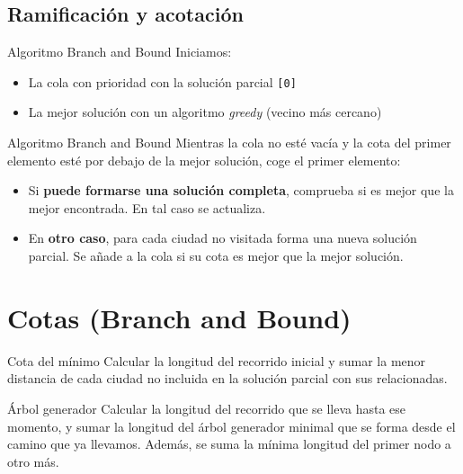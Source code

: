 \subsection{Ramificación y acotación}

\begin{frame}{Algoritmo Branch and Bound}
  Iniciamos:
  \begin{itemize}
    \item La cola con prioridad con la solución parcial \texttt{[0]}
    \item La mejor solución con un algoritmo \textit{greedy} (vecino más cercano)
  \end{itemize}
\end{frame}

\begin{frame}{Algoritmo Branch and Bound}
  Mientras la cola no esté vacía y la cota del primer elemento esté por debajo de la mejor solución, coge el primer elemento:
  \begin{itemize}
    \item Si \textbf{puede formarse una solución completa}, comprueba si es mejor que la mejor encontrada. En tal caso se actualiza.
    \item En \textbf{otro caso}, para cada ciudad no visitada forma una nueva solución parcial. Se añade a la cola si su cota es mejor que la mejor solución.
  \end{itemize}
\end{frame}

\section{Cotas (Branch and Bound)}

\begin{frame}{Cota del mínimo}
  Calcular la longitud del recorrido inicial y sumar la menor distancia de cada ciudad no incluida en la solución parcial con sus relacionadas.
\end{frame}

\begin{frame}{Árbol generador}
  Calcular la longitud del recorrido que se lleva hasta ese momento, y sumar la longitud del árbol generador minimal que se forma desde el camino que ya llevamos. Además, se suma la mínima longitud del primer nodo a otro más.

\end{frame}

